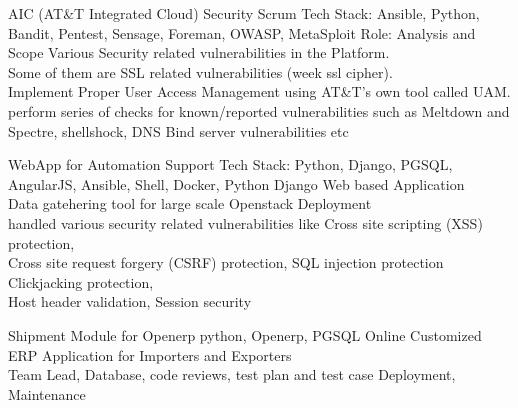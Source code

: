 
\begin{projectentries}

\projectentry
{AIC (AT\&T Integrated Cloud) Security Scrum} %
{Tech Stack: Ansible, Python, Bandit, Pentest, Sensage, Foreman,
OWASP, MetaSploit}
{Role: Analysis and Scope Various Security related vulnerabilities in the
Platform. \\ Some of them are SSL related vulnerabilities (week ssl cipher).
\\ Implement Proper User Access Management using AT\&T’s own tool
called UAM. \\perform series of checks for known/reported vulnerabilities
such as Meltdown and Spectre, shellshock, DNS Bind server
vulnerabilities etc}

\projectentry
{WebApp for Automation Support} %
{Tech Stack: Python, Django, PGSQL, AngularJS, Ansible, Shell, Docker,}
{Python Django Web based Application \\
Data gatehering tool for large scale Openstack Deployment \\
handled various security related vulnerabilities like Cross site scripting (XSS) protection,
\\ Cross site request forgery (CSRF) protection, SQL injection protection Clickjacking protection,
\\ Host header validation, Session security
}

\projectentry
{Shipment Module for Openerp} %
{python, Openerp, PGSQL}
{ Online Customized ERP Application for Importers and Exporters \\
Team Lead, Database, code reviews, test plan and test case Deployment, Maintenance
}

\end{projectentries}